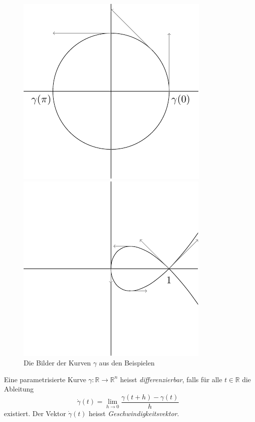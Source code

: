 \documentclass[../main.tex]{subfiles}
\begin{document}
\begin{figure}[htb] 
  \centering
  \begin{minipage}{0.50\textwidth}
    \centering
    \includegraphics{figures/circlecurve}
  \end{minipage}%
  \begin{minipage}{0.50\textwidth}
    \centering
    \includegraphics{figures/butterflycurve}
  \end{minipage}%
  \caption{Die Bilder der Kurven $\gamma$ 
  aus den Beispielen}%
  \label{fig:parametrisations}
\end{figure}

\begin{definition}
  Eine parametrisierte Kurve $\gamma \colon \mathbb{R} \to \mathbb{R}^n$ 
  heisst \emph{differenzierbar}, falls für alle $t \in \mathbb{R}$ 
  die Ableitung
  \[
    \dot{\gamma}(t) = \lim_{h \to 0} \frac{ \gamma(t + h) - \gamma(t)}{h}
  \]
  existiert.
  Der Vektor $\dot{\gamma}(t)$ heisst \emph{Geschwindigkeitsvektor}.
\end{definition}
\end{document}
